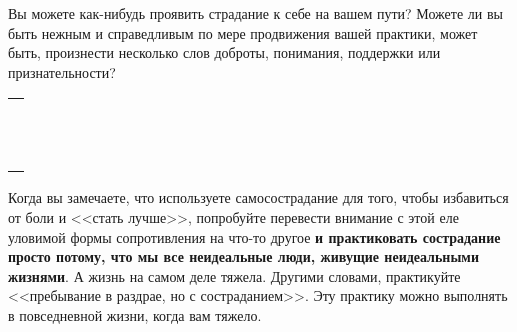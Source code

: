 \begin{itemize}
	\itemWritingHand Вы можете как-нибудь проявить страдание к себе на вашем пути? Можете ли вы быть нежным и справедливым по мере продвижения вашей практики, может быть, произнести несколько слов доброты, понимания, поддержки или признательности?
\end{itemize}

\setlength{\extrarowheight}{2mm}
\begin{tabularx}{0.96\textwidth}{X}
	\\
	\arrayrulecolor{gray}\hline\\
	\hline\\
	\hline\\
	\hline\\
	\hline\\
	\hline\\	
	\hline\\
	\hline\\
	\hline\\
	\hline\\
	\hline\\
	\hline\\
	\hline\\
\end{tabularx}
\setlength{\extrarowheight}{0mm}


\newpage
{} \label{Being_a_Compassionate_Mess}

Когда вы замечаете, что используете самосострадание для того, чтобы избавиться от боли и <<стать лучше>>, попробуйте перевести внимание с этой еле уловимой формы сопротивления на что-то другое \textbf{и практиковать сострадание просто потому, что мы все неидеальные люди, живущие неидеальными жизнями}. А жизнь на самом деле тяжела. Другими словами, практикуйте <<пребывание в раздрае, но с состраданием>>. Эту практику можно выполнять в повседневной жизни, когда вам тяжело. 

